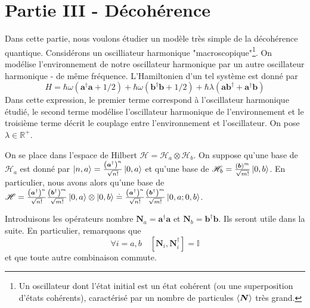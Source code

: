 \documentclass[11pt,oneside,a4paper]{article}
\newcommand{\h}{\ensuremath{\hbar}}
\begin{document}
\newpage
\section{Partie III - Décohérence}
\label{partie 3}
Dans cette partie, nous voulons étudier un modèle très simple de la décohérence quantique. Considérons un oscilliateur harmonique "macroscopique"\footnote{Un oscillateur dont l'état initial est un état cohérent (ou une superposition d'états cohérents), caractérisé  par un nombre de particules $\expval{\bm{N}}$ très grand.}. On modélise l'environnement de notre oscillateur harmonique par un autre oscillateur harmonique - de même fréquence. L'Hamiltonien d'un tel système est donné par
\begin{equation}
  \label{eq:Hamiltonien partie III}
  H = \h\omega\left(\bm{a}^\dagger\bm{a}+1/2\right)+\h\omega\left(\bm{b}^\dagger\bm{b}+1/2\right)+\h\lambda\left(\bm{a}\bm{b}^\dagger+\bm{a}^\dagger\bm{b}\right)
\end{equation}
Dans cette expression, le premier terme correspond à l'oscillateur harmonique étudié, le second terme modélise l'oscillateur harmonique de l'environnement et le troisième terme décrit le couplage entre l'environnement et l'oscillateur. On pose $\lambda\in\mathbb{R}^+$.

On se place dans l'espace de Hilbert $\mathcal{H} = \mathcal{H}_a\otimes\mathcal{H}_b$. On suppose qu'une base de $\mathcal{H}_a$ est donné par $\ket{n,a} = \frac{\left(\bm{a}^\dagger\right)^n}{\sqrt{n!}}\ket{0,a}$ et qu'une base de $\mathcal{H}_b = \frac{\left(\bm{b}\right)^m}{\sqrt{m!}}\ket{0,b}$. En particulier, nous avons alors qu'une base de $\mathcal{H} = \frac{\left(\bm{a}^\dagger\right)^n}{\sqrt{n!}}\frac{\left(\bm{b}^\dagger\right)^m}{\sqrt{m!}}\ket{0,a}\otimes\ket{0,b} \doteq \frac{\left(\bm{a}^\dagger\right)^n}{\sqrt{n!}}\frac{\left(\bm{b}^\dagger\right)^m}{\sqrt{m!}}\ket{0,a;0,b}$.

Introduisons les opérateurs nombre $\bm{N}_a = \bm{a}^\dagger\bm{a}$ et $\bm{N}_b = \bm{b}^\dagger\bm{b}$. Ils seront utile dans la suite. En particulier, remarquons que 
\begin{equation}
  \label{eq:commutateur NaNb}
  \forall i=a,b \quad [\bm{N}_i,\bm{N}^\dagger_i] = \mathbb{I} 
\end{equation}
et que toute autre combinaison commute. 
\end{document}
